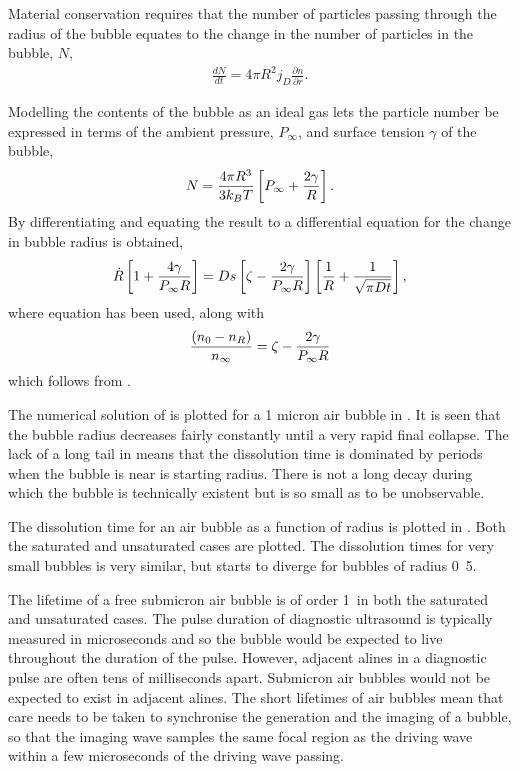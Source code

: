 Material conservation requires that the number of particles passing through the radius of the bubble
equates to the change in the number of particles in the bubble, $N$,
\begin{align}
  \frac{dN}{dt} =4 \pi R^2 j_D\frac{\partial n}{\partial r}.
\label{eqn:nuc:materialCons}
\end{align}

Modelling the contents of the bubble as an ideal gas lets the particle number be expressed in terms of the ambient pressure, $P_\infty$, and surface tension $\gamma$ of the bubble,
\begin{align}
  N = \frac{4\pi R^3 }{3k_B T} \left[ P_\infty + \frac{2\gamma}{R} \right].
  \label{eqn:nuc:ParticleNumber}
\end{align}
By differentiating  and equating the result to  a differential equation for the change in bubble radius is obtained,
\begin{align}
   \dot{R}\left[  1+ \frac{4\gamma}{P_\infty R} \right] = Ds\left[  \zeta - \frac{2\gamma}{P_\infty R} \right]\left[ \frac{1}{R} + \frac{1}{\sqrt{\pi D t}} \right],
   \label{eqn:nuc:Rdot}
\end{align}
where equation  has been used, along with
\begin{align}
  \frac{\left( n_0 - n_R \right)}{n_\infty} = \zeta - \frac{2\gamma}{P_\infty R}
  \label{eqn:nuc:dissolve}
\end{align}
which follows from .






The numerical solution of  is plotted for a 1 micron air bubble in .
It is seen that the bubble radius decreases fairly constantly until a very rapid final collapse.
The lack of a long tail in 
means that the dissolution time is dominated by periods when the bubble is near is starting radius.
There is not a long decay during which the bubble is technically existent but is so small as to be unobservable.

The dissolution time for an air bubble as a function of radius is plotted in .
Both the saturated and unsaturated cases are plotted.
The dissolution times for very small bubbles is very similar,
but starts to diverge for bubbles of radius \unit{0.5}\micro\metre.

The lifetime of a free submicron air bubble is of order \unit{1}\milli\second\ in both the  saturated and unsaturated cases.
The pulse duration of diagnostic ultrasound is typically measured in microseconds and so the bubble would be expected to live throughout the duration of the pulse.
However, adjacent alines in a diagnostic pulse are often tens of milliseconds apart.
Submicron air bubbles would not be expected to exist in adjacent alines.
The short lifetimes of air bubbles mean that care needs to be taken to synchronise the generation and the imaging of a bubble,
so that the imaging wave samples the same focal region as the driving wave within a few microseconds of the driving wave passing.


